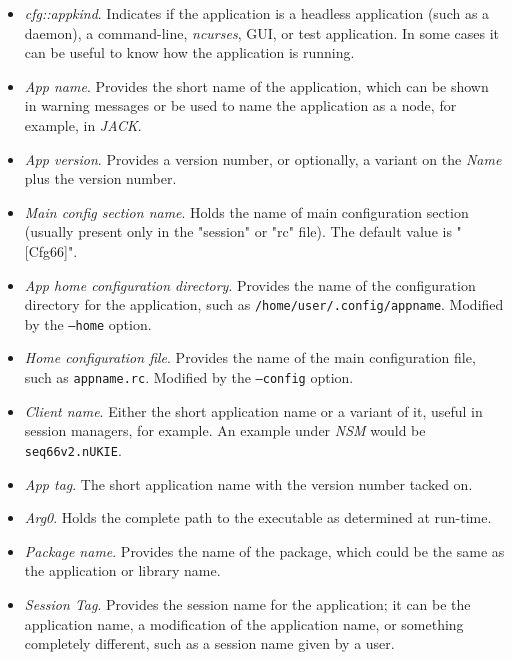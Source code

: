    \begin{itemize}
      \item \textsl{cfg::appkind}.
         Indicates if the application is a headless application (such as a
         daemon), a command-line, \textsl{ncurses}, GUI, or test application.
         In some cases it can be useful to know how the application is
         running.
      \item \textsl{App name}.
         Provides the short name of the application, which can be shown
         in warning messages or be used to name the application as a node, for
         example, in \textsl{JACK}.
      \item \textsl{App version}.
         Provides a version number, or optionally, a variant on the
         \textsl{Name} plus the version number.
      \item \textsl{Main config section name}.
         Holds the name of main configuration section (usually present
         only in the "session" or "rc" file).
         The default value is "[Cfg66]".
      \item \textsl{App home configuration directory}.
         Provides the name of the configuration directory for the application,
         such as \texttt{/home/user/.config/appname}.
         Modified by the \texttt{--home} option.
      \item \textsl{Home configuration file}.
         Provides the name of the main configuration file, such as
         \texttt{appname.rc}.
         Modified by the \texttt{--config} option.
      \item \textsl{Client name}.
         Either the short application name or a variant of it, useful in session
         managers, for example.
         An example under \textsl{NSM} would be \texttt{seq66v2.nUKIE}.
      \item \textsl{App tag}.
         The short application name with the version number tacked on.
      \item \textsl{Arg0}.
         Holds the complete path to the executable as determined at run-time.
      \item \textsl{Package name}.
         Provides the name of the package, which could be the same as the
         application or library name.
      \item \textsl{Session Tag}.
         Provides the session name for the application; it can be the
         application name, a modification of the application name, or
         something completely different, such as a session name given by
         a user.

\end{itemize}
